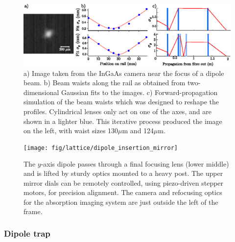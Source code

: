 	\begin{figure}
	\includegraphics[width=\textwidth]{fig/lattice/dipole_profle_combo}
	\caption{a) Image taken from the InGaAs camera near the focus of a dipole beam.
	b) Beam waists along the rail as obtained from two-dimensional Gaussian fits to the images.
	c) Forward-propagation simulation of the beam waists which was designed to reshape the profiles.
	Cylindrical lenses only act on one of the axes, and are shown in a lighter blue.
	This iterative process produced the image on the left, with waist sizes 130$\mu$m and 124$\mu$m.}
	\label{fig:profiling}
	\end{figure}



	\begin{figure}
		\begin{minipage}{0.4\textwidth}
		\vspace{0cm}
		\caption{The $y$-axis dipole passes through a final focusing lens (lower middle) and is lifted by sturdy optics mounted to a heavy post.
	The upper mirror dials can be remotely controlled, using piezo-driven stepper motors, for precision alignment.
	The camera and refocusing optics for the absorption imaging system are just outside the left of the frame.}
		\label{fig:lifetime}
		\end{minipage}
		\hfill
		\begin{minipage}{0.6\textwidth}
		\vspace{0cm}
		\texttt{[image: fig/lattice/dipole\_insertion\_mirror]} %
		\end{minipage}
	\end{figure}



\subsubsection{Dipole trap}
\label{sec:dipole_trap}

